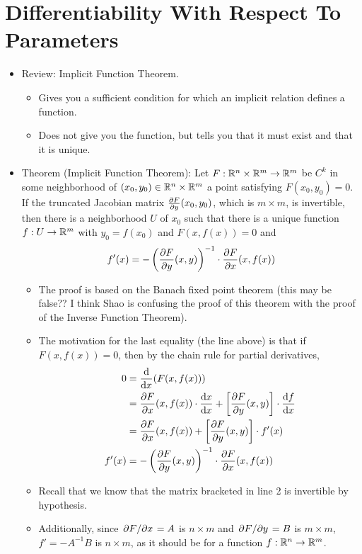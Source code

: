 \documentclass[../notes.tex]{subfiles}
\begin{document}
\section{Differentiability With Respect To Parameters}
\begin{itemize}
    \item {}Review: Implicit Function Theorem.
    \begin{itemize}
        \item Gives you a sufficient condition for which an implicit relation defines a function.
        \item Does not give you the function, but tells you that it must exist and that it is unique.
    \end{itemize}
    \item Theorem (Implicit Function Theorem): Let $F:\mathbb{R}^n\times\mathbb{R}^m\to\mathbb{R}^m$ be $C^k$ in some neighborhood of $(x_0,y_0)\in\mathbb{R}^n\times\mathbb{R}^m$ a point satisfying $F(x_0,y_0)=0$. If the truncated Jacobian matrix ${\pdv{F}{y}}(x_0,y_0)$, which is $m\times m$, is invertible, then there is a neighborhood $U$ of $x_0$ such that there is a unique function $f:U\to\mathbb{R}^m$ with $y_0=f(x_0)$ and $F(x,f(x))=0$ and
    \begin{equation*}
        f'(x) = -\left( {\pdv{F}{y}}(x,y) \right)^{-1}\cdot{\pdv{F}{x}}(x,f(x))
    \end{equation*}
    \begin{itemize}
        \item The proof is based on the Banach fixed point theorem (this may be false?? I think Shao is confusing the proof of this theorem with the proof of the Inverse Function Theorem).
        \item The motivation for the last equality (the line above) is that if $F(x,f(x))=0$, then by the chain rule for partial derivatives,
        \begin{align*}
            0 &= \dv{x}(F(x,f(x)))\\
            &= {\pdv{F}{x}}(x,f(x))\cdot\dv{x}{x}+\left[ {\pdv{F}{y}}(x,y) \right]\cdot\dv{f}{x}\\
            &= {\pdv{F}{x}}(x,f(x))+\left[ {\pdv{F}{y}}(x,y) \right]\cdot f'(x)\\
            f'(x) &= -\left( {\pdv{F}{y}}(x,y) \right)^{-1}\cdot{\pdv{F}{x}}(x,f(x))
        \end{align*}
        \item Recall that we know that the matrix bracketed in line 2 is invertible by hypothesis.
        \item Additionally, since $\pdv*{F}{x}=A$ is $n\times m$ and $\pdv*{F}{y}=B$ is $m\times m$, $f'=-A^{-1}B$ is $n\times m$, as it should be for a function $f:\mathbb{R}^n\to\mathbb{R}^m$.

\end{itemize}
\end{itemize}
\end{document}
